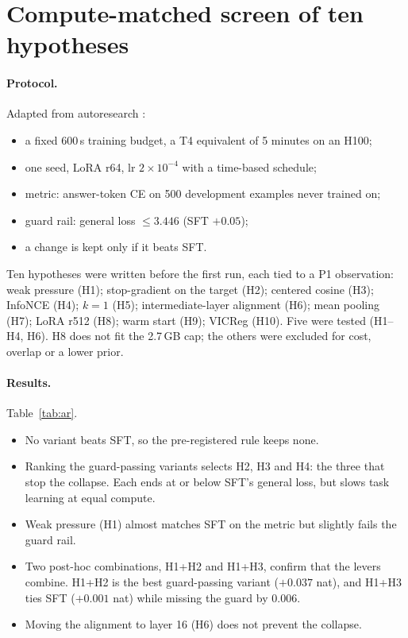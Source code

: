 \documentclass[11pt]{article}
\begin{document}
\section{Compute-matched screen of ten hypotheses}
\label{sec:ar}
\paragraph{Protocol.} Adapted from autoresearch \cite{karpathy2026autoresearch}:
\begin{itemize}
\item a fixed 600\,s training budget, a T4 equivalent of 5 minutes on an H100;
\item one seed, LoRA r64, lr $2\times10^{-4}$ with a time-based schedule;
\item metric: answer-token CE on 500 development examples never trained on;
\item guard rail: general loss $\le3.446$ (SFT $+0.05$);
\item a change is kept only if it beats SFT.
\end{itemize}
Ten hypotheses were written before the first run, each tied to a P1 observation: weak pressure (H1); stop-gradient on
the target (H2); centered cosine (H3); InfoNCE (H4); $k=1$ (H5); intermediate-layer alignment (H6); mean pooling (H7);
LoRA r512 (H8); warm start (H9); VICReg (H10). Five were tested (H1--H4, H6). H8 does not fit the 2.7\,GB cap; the
others were excluded for cost, overlap or a lower prior.

\paragraph{Results.} Table~\ref{tab:ar}.
\begin{itemize}
\item No variant beats SFT, so the pre-registered rule keeps none.
\item Ranking the guard-passing variants selects H2, H3 and H4: the three that stop the collapse. Each ends at or below
SFT's general loss, but slows task learning at equal compute.
\item Weak pressure (H1) almost matches SFT on the metric but slightly fails the guard rail.
\item Two post-hoc combinations, H1+H2 and H1+H3, confirm that the levers combine. H1+H2 is the best guard-passing
variant ($+0.037$ nat), and H1+H3 ties SFT ($+0.001$ nat) while missing the guard by 0.006.
\item Moving the alignment to layer 16 (H6) does not prevent the collapse.
\end{itemize}
\end{document}
